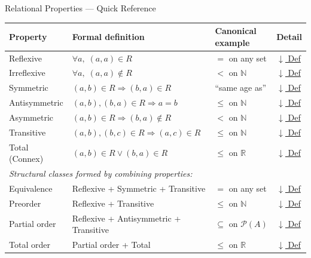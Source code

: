 \begin{toolkitbox}{Relational Properties --- Quick Reference}
\small
\begin{tabular}{l l l l}
\toprule
\textbf{Property} & \textbf{Formal definition} & \textbf{Canonical example} & \textbf{Detail} \\
\midrule
Reflexive      & $\forall a,\; (a,a)\in R$                           & $=$ on any set      & \hyperref[def:reflexive]{$\downarrow$ Def} \\
Irreflexive    & $\forall a,\; (a,a)\notin R$                        & $<$ on $\mathbb{N}$ & \hyperref[def:irreflexive]{$\downarrow$ Def} \\
Symmetric      & $(a,b)\in R \Rightarrow (b,a)\in R$                 & ``same age as''     & \hyperref[def:symmetric]{$\downarrow$ Def} \\
Antisymmetric  & $(a,b),(b,a)\in R \Rightarrow a=b$                  & $\leq$ on $\mathbb{N}$ & \hyperref[def:antisymmetric]{$\downarrow$ Def} \\
Asymmetric     & $(a,b)\in R \Rightarrow (b,a)\notin R$              & $<$ on $\mathbb{N}$ & \hyperref[def:asymmetric]{$\downarrow$ Def} \\
Transitive     & $(a,b),(b,c)\in R \Rightarrow (a,c)\in R$           & $\leq$ on $\mathbb{N}$ & \hyperref[def:transitive]{$\downarrow$ Def} \\
Total (Connex) & $(a,b)\in R \lor (b,a)\in R$                        & $\leq$ on $\mathbb{R}$ & \hyperref[def:total-rel]{$\downarrow$ Def} \\
\midrule
\multicolumn{4}{l}{\textit{Structural classes formed by combining properties:}} \\
\midrule
Equivalence    & Reflexive + Symmetric + Transitive                  & $=$ on any set      & \hyperref[def:equivalence-rel]{$\downarrow$ Def} \\
Preorder       & Reflexive + Transitive                              & $\leq$ on $\mathbb{N}$ & \hyperref[def:preorder]{$\downarrow$ Def} \\
Partial order  & Reflexive + Antisymmetric + Transitive              & $\subseteq$ on $\mathcal{P}(A)$ & \hyperref[def:partial-order]{$\downarrow$ Def} \\
Total order    & Partial order + Total                               & $\leq$ on $\mathbb{R}$ & \hyperref[def:total-order]{$\downarrow$ Def} \\
\bottomrule
\end{tabular}
\end{toolkitbox}


